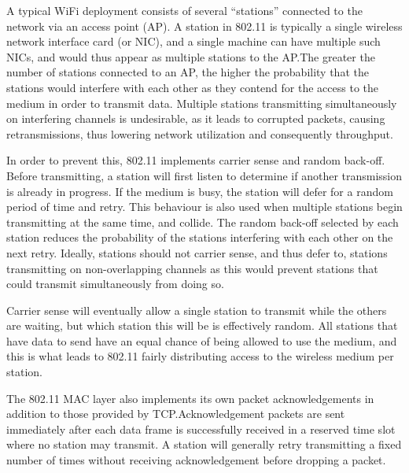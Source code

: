 A typical WiFi deployment consists of several ``stations'' connected to
the network via an access point (AP). A station in 802.11 is typically a single
wireless network interface card (or NIC), and a single machine can have multiple
such NICs, and would thus appear as multiple stations to the AP.\@ The greater
the number of stations connected to an AP, the higher the probability that the
stations would interfere with each other as they contend for the access to the
medium in order to transmit data. Multiple stations transmitting simultaneously
on interfering channels is undesirable, as it leads to corrupted packets,
causing retransmissions, thus lowering network utilization and
consequently throughput.

In order to prevent this, 802.11 implements carrier sense and random back-off. Before
transmitting, a station will first listen to determine if another transmission is already
in progress. If the medium is busy, the station will defer for a
random period of time and retry. This behaviour is also used when multiple
stations begin transmitting at the same time, and collide. The random back-off
selected by each station reduces the probability of the stations interfering
with each other on the next retry. Ideally, stations should not carrier sense,
and thus defer to, stations transmitting on non-overlapping channels as this would prevent stations
that could transmit simultaneously from doing so.

Carrier sense will eventually allow a single station to transmit while the
others are waiting, but which station this will be is effectively random. All
stations that have data to send have an equal chance of being allowed to use the
medium, and this is what leads to 802.11 fairly distributing access to the
wireless medium per station.

The 802.11 MAC layer also implements its own packet acknowledgements in addition
to those provided by TCP.\@ Acknowledgement packets are sent immediately after
each data frame is successfully received in a reserved time slot where no station
may transmit. A station will generally retry transmitting a fixed number of times
without receiving acknowledgement before dropping a packet.

